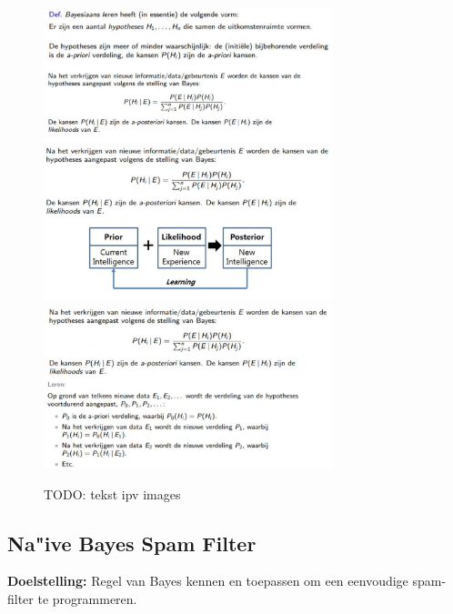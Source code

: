 \documentclass{article}
\begin{document}
\begin{figure}[H]
    \centering
    \includegraphics[width=0.75\textwidth]{bayesiaans-leren.png}
    \includegraphics[width=0.75\textwidth]{bayesiaans-leren2.png}
    \includegraphics[width=0.75\textwidth]{bayesiaans-leren3.png}
    \caption{TODO: tekst ipv images}
\end{figure}


\subsection{Na"ive Bayes Spam Filter}

\textbf{Doelstelling:} Regel van Bayes kennen en toepassen om een eenvoudige spam-filter te programmeren.
\end{document}
